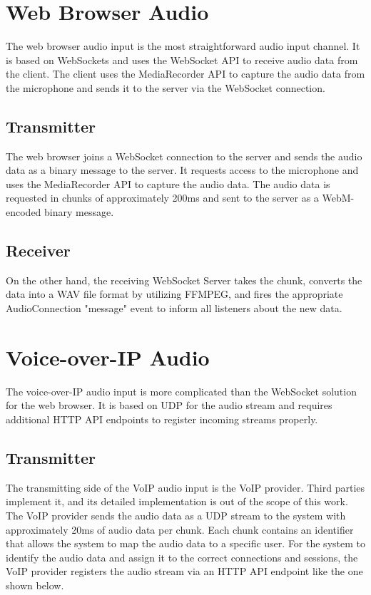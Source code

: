 \section{Web Browser Audio}

The web browser audio input is the most straightforward audio input channel. It is based on WebSockets and
uses the WebSocket API to receive audio data from the client. The client uses the MediaRecorder API to capture the 
audio data from the microphone and sends it to the server via the WebSocket connection.

\subsection{Transmitter}

The web browser joins a WebSocket connection to the server and sends the audio data as a binary message to the server. 
It requests access to the microphone and uses the MediaRecorder API to capture the audio data. 
The audio data is requested in chunks of approximately 200ms and sent to the server as a WebM-encoded binary message.

\subsection{Receiver}

On the other hand, the receiving WebSocket Server takes the chunk, converts the data into a WAV file format by 
utilizing FFMPEG, and fires the appropriate AudioConnection "message" event to inform all listeners about the new data.


\section{Voice-over-IP Audio}

The voice-over-IP audio input is more complicated than the WebSocket solution for the web browser. It is based on UDP 
for the audio stream and requires additional HTTP API endpoints to register incoming streams properly.

\subsection{Transmitter}

The transmitting side of the VoIP audio input is the VoIP provider. Third parties implement it, and its detailed 
implementation is out of the scope of this work. The VoIP provider sends the audio data as a UDP stream to the system 
with approximately 20ms of audio data per chunk. Each chunk contains an identifier that allows the system to map the 
audio data to a specific user. For the system to identify the audio data and assign it to the correct connections and 
sessions, the VoIP provider registers the audio stream via an HTTP API endpoint like the one shown below.

